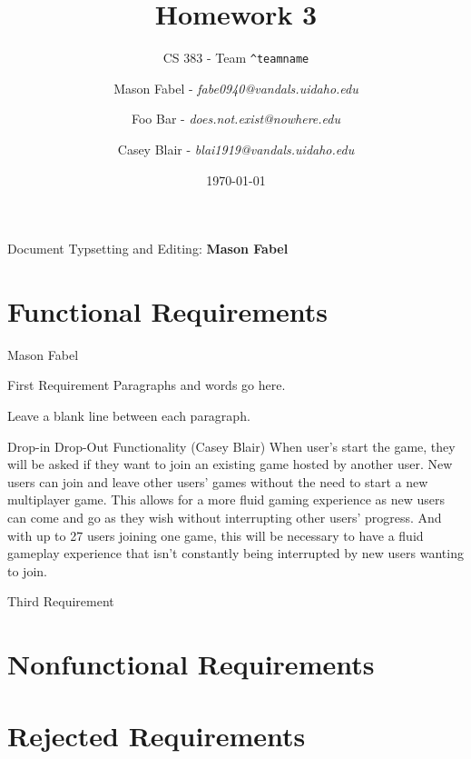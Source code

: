 \documentclass[12pt]{report}
\title{Homework 3}
\subtitle{CS 383 - Team \texttt{\textasciicircum teamname}}
\author{
Mason Fabel - \textit{fabe0940@vandals.uidaho.edu} \\
\and Foo Bar - \textit{does.not.exist@nowhere.edu} \\
\and Casey Blair - \textit{blai1919@vandals.uidaho.edu} \\
}
\date{\today}
\begin{document}
\maketitle

\tableofcontents
Document Typsetting and Editing: \textbf{Mason Fabel}
\clearpage


\chapter{Functional Requirements}

\begin{section}{Mason Fabel}
\begin{subsection}{First Requirement}
Paragraphs and words go here.

Leave a blank line between each paragraph.
\end{subsection}

\begin{subsection}{Drop-in Drop-Out Functionality (Casey Blair)}
When user’s start the game, they will be asked if they want to join an existing game hosted by another user. New users can join and leave other users’ games without the need to start a new multiplayer game. This allows for a more fluid gaming experience as new users can come and go as they wish without interrupting other users’ progress. And with up to 27 users joining one game, this will be necessary to have a fluid gameplay experience that isn’t constantly being interrupted by new users wanting to join.
\end{subsection}

\begin{subsection}{Third Requirement}
\end{subsection}
\end{section}

\chapter{Nonfunctional Requirements}

\chapter{Rejected Requirements}
\end{document}
